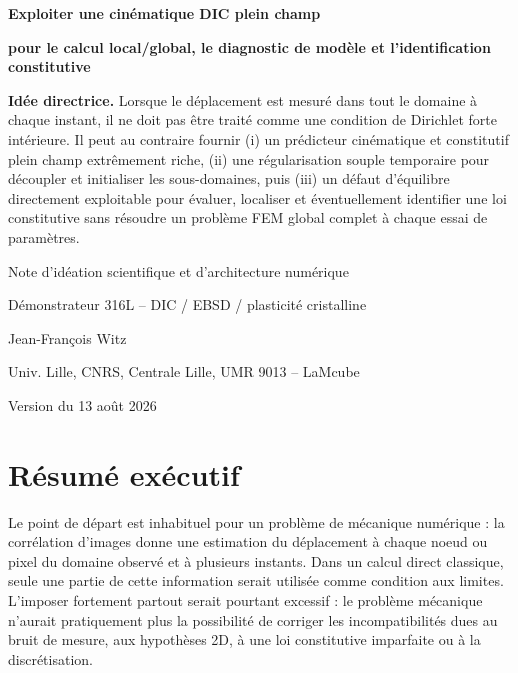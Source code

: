 \documentclass[11pt,a4paper]{article}
\begin{document}
\begin{titlepage}
  \centering
  \vspace*{1.2cm}
  {\Huge\bfseries\color{mainblue}
  Exploiter une cinématique DIC plein champ\par}
  \vspace{0.35cm}
  {\LARGE\bfseries
  pour le calcul local/global, le diagnostic de modèle et l'identification constitutive\par}
  \vspace{0.9cm}

  \begin{thesisbox}
  \large
  \textbf{Idée directrice.} Lorsque le déplacement est mesuré dans tout le domaine à chaque instant,
  il ne doit pas être traité comme une condition de Dirichlet forte intérieure. Il peut au contraire
  fournir (i) un prédicteur cinématique et constitutif plein champ extrêmement riche, (ii) une
  régularisation souple temporaire pour découpler et initialiser les sous-domaines, puis (iii) un
  défaut d'équilibre directement exploitable pour évaluer, localiser et éventuellement identifier
  une loi constitutive sans résoudre un problème FEM global complet à chaque essai de paramètres.
  \end{thesisbox}

  \vspace{0.8cm}
  {\large Note d'idéation scientifique et d'architecture numérique\par}
  \vspace{0.25cm}
  {\normalsize Démonstrateur 316L -- DIC / EBSD / plasticité cristalline\par}

  \vfill
  {\large Jean-François Witz\par}
  {\normalsize Univ. Lille, CNRS, Centrale Lille, UMR 9013 -- LaMcube\par}
  \vspace{0.45cm}
  {\normalsize Version du 13 août 2026\par}
\end{titlepage}

\tableofcontents
\newpage

\section*{Résumé exécutif}

Le point de départ est inhabituel pour un problème de mécanique numérique : la corrélation
 d'images donne une estimation du déplacement à chaque noeud ou pixel du domaine observé et
à plusieurs instants. Dans un calcul direct classique, seule une partie de cette information serait
utilisée comme condition aux limites. L'imposer fortement partout serait pourtant excessif : le
problème mécanique n'aurait pratiquement plus la possibilité de corriger les incompatibilités dues
au bruit de mesure, aux hypothèses 2D, à une loi constitutive imparfaite ou à la discrétisation.
\end{document}
